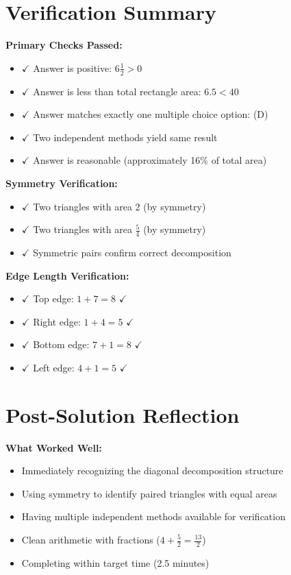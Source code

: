\documentclass[11pt]{article}
\begin{document}
\section*{Verification Summary}

\textbf{Primary Checks Passed:}
\begin{itemize}
    \item $\checkmark$ Answer is positive: $6\frac{1}{2} > 0$
    \item $\checkmark$ Answer is less than total rectangle area: $6.5 < 40$
    \item $\checkmark$ Answer matches exactly one multiple choice option: (D)
    \item $\checkmark$ Two independent methods yield same result
    \item $\checkmark$ Answer is reasonable (approximately 16\% of total area)
\end{itemize}

\textbf{Symmetry Verification:}
\begin{itemize}
    \item $\checkmark$ Two triangles with area 2 (by symmetry)
    \item $\checkmark$ Two triangles with area $\frac{5}{4}$ (by symmetry)
    \item $\checkmark$ Symmetric pairs confirm correct decomposition
\end{itemize}

\textbf{Edge Length Verification:}
\begin{itemize}
    \item $\checkmark$ Top edge: $1 + 7 = 8$ $\checkmark$
    \item $\checkmark$ Right edge: $1 + 4 = 5$ $\checkmark$
    \item $\checkmark$ Bottom edge: $7 + 1 = 8$ $\checkmark$
    \item $\checkmark$ Left edge: $4 + 1 = 5$ $\checkmark$
\end{itemize}

\section*{Post-Solution Reflection}

\textbf{What Worked Well:}
\begin{itemize}
    \item Immediately recognizing the diagonal decomposition structure
    \item Using symmetry to identify paired triangles with equal areas
    \item Having multiple independent methods available for verification
    \item Clean arithmetic with fractions ($4 + \frac{5}{2} = \frac{13}{2}$)
    \item Completing within target time (2.5 minutes)
\end{itemize}
\end{document}
